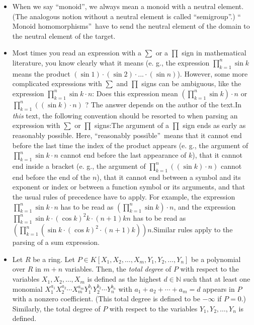 \documentclass[numbers=enddot,12pt,final,onecolumn,notitlepage]{scrartcl}%
\begin{document}
\begin{itemize}
\item When we say \textquotedblleft monoid\textquotedblright, we always mean a
monoid with a neutral element. (The analogous notion without a neutral element
is called \textquotedblleft semigroup\textquotedblright.) \textquotedblleft
Monoid homomorphisms\textquotedblright\ have to send the neutral element of
the domain to the neutral element of the target.

\item Most times you read an expression with a $\sum$ or a $\prod$ sign in
mathematical literature, you know clearly what it means (e. g., the expression
$\prod\limits_{k=1}^{n}\sin k$ means the product $\left(  \sin1\right)
\cdot\left(  \sin2\right)  \cdot...\cdot\left(  \sin n\right)  $). However,
some more complicated expressions with $\sum$ and $\prod$ signs can be
ambiguous, like the expression $\prod\limits_{k=1}^{n}\sin k\cdot n$: Does
this expression mean $\left(  \prod\limits_{k=1}^{n}\sin k\right)  \cdot n$ or
$\prod\limits_{k=1}^{n}\left(  \left(  \sin k\right)  \cdot n\right)  $ ? The
answer depends on the author of the text.\newline In \textit{this} text, the
following convention should be resorted to when parsing an expression with
$\sum$ or $\prod$ signs:\newline The argument of a $\prod$ sign ends as early
as reasonably possible. Here, \textquotedblleft reasonably
possible\textquotedblright\ means that it cannot end before the last time the
index of the product appears (e. g., the argument of $\prod\limits_{k=1}%
^{n}\sin k\cdot n$ cannot end before the last appearance of $k$), that it
cannot end inside a bracket (e. g., the argument of $\prod\limits_{k=1}%
^{n}\left(  \left(  \sin k\right)  \cdot n\right)  $ cannot end before the end
of the $n$), that it cannot end between a symbol and its exponent or index or
between a function symbol or its arguments, and that the usual rules of
precedence have to apply. For example, the expression $\prod\limits_{k=1}%
^{n}\sin k\cdot n$ has to be read as $\left(  \prod\limits_{k=1}^{n}\sin
k\right)  \cdot n$, and the expression $\prod\limits_{k=1}^{n}\sin
k\cdot\left(  \cos k\right)  ^{2}k\cdot\left(  n+1\right)  kn$ has to be read
as $\left(  \prod\limits_{k=1}^{n}\left(  \sin k\cdot\left(  \cos k\right)
^{2}\cdot\left(  n+1\right)  k\right)  \right)  n$.\newline Similar rules
apply to the parsing of a sum expression.

\item Let $R$ be a ring. Let $P\in K\left[  X_{1},X_{2},\ldots,X_{m}%
,Y_{1},Y_{2},\ldots,Y_{n}\right]  $ be a polynomial over $R$ in $m+n$
variables. Then, the \textit{total degree} of $P$ with respect to the
variables $X_{1},X_{2},\ldots,X_{m}$ is defined as the highest $d\in
\mathbb{N}$ such that at least one monomial $X_{1}^{a_{1}}X_{2}^{a_{2}}\cdots
X_{m}^{a_{m}}Y_{1}^{b_{1}}Y_{2}^{b_{2}}\cdots Y_{n}^{b_{n}}$ with $a_{1}%
+a_{2}+\cdots+a_{m}=d$ appears in $P$ with a nonzero coefficient. (This total
degree is defined to be $-\infty$ if $P=0$.) Similarly, the total degree of
$P$ with respect to the variables $Y_{1},Y_{2},\ldots,Y_{n}$ is defined.


\end{itemize}
\end{document}
